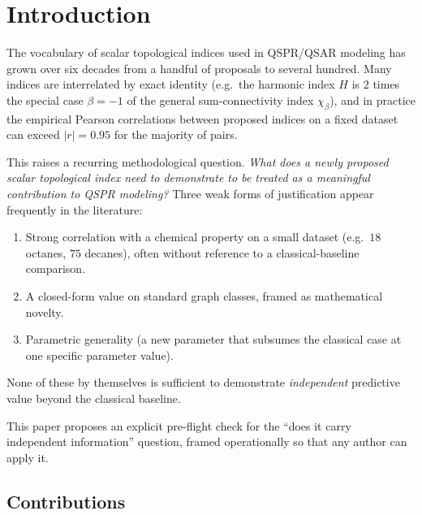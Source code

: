 \documentclass[11pt,a4paper]{article}
\theoremstyle{definition}
\begin{document}
\begin{abstract}
\medskip
\noindent\textbf{Keywords.} Topological index, orthogonality
screening, redundancy analysis, QSPR, principal component analysis,
partial correlation, bond-incident-degree (BID) family.

\medskip
\noindent\textbf{Code and data.}
\url{https://github.com/Singati2/topological-index-orthogonality}
\end{abstract}

\section{Introduction}

The vocabulary of scalar topological indices used in QSPR/QSAR
modeling has grown over six decades from a handful of
proposals \cite{Wiener1947, Randic1975, Gutman1972} to several
hundred. Many indices are interrelated by exact identity (e.g.\
the harmonic index $H$ is $2$ times the special case
$\beta=-1$ of the general sum-connectivity index $\chi_\beta$), and
in practice the empirical Pearson correlations between proposed
indices on a fixed dataset can exceed $|r|=0.95$ for the majority
of pairs.

This raises a recurring methodological question. \emph{What does a
newly proposed scalar topological index need to demonstrate to be
treated as a meaningful contribution to QSPR modeling?} Three
weak forms of justification appear frequently in the literature:
\begin{enumerate}[label=(\roman*)]
\item Strong correlation with a chemical property on a small dataset
(e.g.\ $18$ octanes, $75$ decanes), often without reference to a
classical-baseline comparison.
\item A closed-form value on standard graph classes, framed as
mathematical novelty.
\item Parametric generality (a new parameter that subsumes the
classical case at one specific parameter value).
\end{enumerate}
None of these by themselves is sufficient to demonstrate
\emph{independent} predictive value beyond the classical baseline.

This paper proposes an explicit pre-flight check for the
``does it carry independent information'' question, framed
operationally so that any author can apply it.

\subsection{Contributions}
\end{document}
